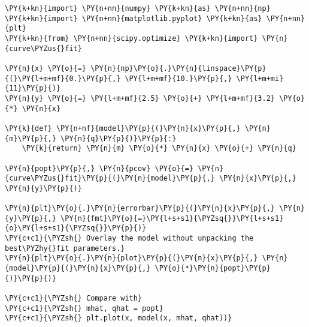 \begin{Verbatim}[label=\makebox{\url{https://bitbucket.org/lbaldini/programming/src/tip/snippets/func\_variadic\_fit.py}},commandchars=\\\{\}]
\PY{k+kn}{import} \PY{n+nn}{numpy} \PY{k+kn}{as} \PY{n+nn}{np}
\PY{k+kn}{import} \PY{n+nn}{matplotlib.pyplot} \PY{k+kn}{as} \PY{n+nn}{plt}
\PY{k+kn}{from} \PY{n+nn}{scipy.optimize} \PY{k+kn}{import} \PY{n}{curve\PYZus{}fit}

\PY{n}{x} \PY{o}{=} \PY{n}{np}\PY{o}{.}\PY{n}{linspace}\PY{p}{(}\PY{l+m+mf}{0.}\PY{p}{,} \PY{l+m+mf}{10.}\PY{p}{,} \PY{l+m+mi}{11}\PY{p}{)}
\PY{n}{y} \PY{o}{=} \PY{l+m+mf}{2.5} \PY{o}{+} \PY{l+m+mf}{3.2} \PY{o}{*} \PY{n}{x}

\PY{k}{def} \PY{n+nf}{model}\PY{p}{(}\PY{n}{x}\PY{p}{,} \PY{n}{m}\PY{p}{,} \PY{n}{q}\PY{p}{)}\PY{p}{:}
    \PY{k}{return} \PY{n}{m} \PY{o}{*} \PY{n}{x} \PY{o}{+} \PY{n}{q}

\PY{n}{popt}\PY{p}{,} \PY{n}{pcov} \PY{o}{=} \PY{n}{curve\PYZus{}fit}\PY{p}{(}\PY{n}{model}\PY{p}{,} \PY{n}{x}\PY{p}{,} \PY{n}{y}\PY{p}{)}

\PY{n}{plt}\PY{o}{.}\PY{n}{errorbar}\PY{p}{(}\PY{n}{x}\PY{p}{,} \PY{n}{y}\PY{p}{,} \PY{n}{fmt}\PY{o}{=}\PY{l+s+s1}{\PYZsq{}}\PY{l+s+s1}{o}\PY{l+s+s1}{\PYZsq{}}\PY{p}{)}
\PY{c+c1}{\PYZsh{} Overlay the model without unpacking the best\PYZhy{}fit parameters.}
\PY{n}{plt}\PY{o}{.}\PY{n}{plot}\PY{p}{(}\PY{n}{x}\PY{p}{,} \PY{n}{model}\PY{p}{(}\PY{n}{x}\PY{p}{,} \PY{o}{*}\PY{n}{popt}\PY{p}{)}\PY{p}{)}

\PY{c+c1}{\PYZsh{} Compare with}
\PY{c+c1}{\PYZsh{} mhat, qhat = popt}
\PY{c+c1}{\PYZsh{} plt.plot(x, model(x, mhat, qhat))}
\end{Verbatim}